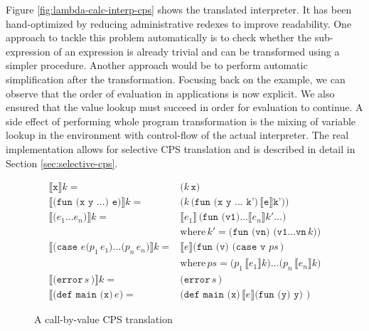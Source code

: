 Figure \ref{fig:lambda-calc-interp-cps} shows the translated interpreter.
It has been hand-optimized by reducing administrative redexes to improve readability.
One approach to tackle this problem automatically is to check whether the sub-expression of an expression is already trivial and can be transformed using a simpler procedure.
Another approach would be to perform automatic simplification after the transformation.
Focusing back on the example, we can observe that the order of evaluation in applications is now explicit.
We also ensured that the value lookup must succeed in order for evaluation to continue.
A side effect of performing whole program transformation is the mixing of variable lookup in the environment with control-flow of the actual interpreter.
The real implementation allows for selective CPS translation and is described in detail in Section \ref{sec:selective-cps}.
\begin{figure}
    \centering
   \begin{align*}
        \llbracket \texttt{x} \rrbracket k =& \texttt{(}k\,\texttt{x)}\\
%
        \llbracket \texttt{(fun (x y ...) e)} \rrbracket k
        =& \texttt{(} k \, \texttt{(fun (x y ... k')}\, \llbracket \texttt{e} \rrbracket \texttt{k'))} \\
%        
        \llbracket \texttt{(}e_1\ldots e_n\texttt{)} \rrbracket k
        =& \llbracket e_1 \rrbracket \, \texttt{(fun (v1)} \ldots \llbracket e_n \rrbracket k' \ldots \texttt{)}\, \\
         & \text{where}\,k' = \texttt{(fun (vn) (v1...vn}\,k\texttt{))} \\
%        
        \llbracket \texttt{(case } e \texttt{(} p_1\,e_1\texttt{)}\ldots \texttt{(} p_n\,e_n\texttt{)} \rrbracket k
        =& \llbracket e \rrbracket \texttt{(fun (v) (case v }ps \,\texttt{)}\\
         & \text{where}\,ps = \texttt{(} p_1\,\llbracket e_1 \rrbracket k  \texttt{)}\ldots \texttt{(} p_n\,\llbracket e_n \rrbracket k \texttt{)}\\
%
        \llbracket \texttt{(error}\,s\,\texttt{)} \rrbracket k
        =& \texttt{(error}\,s\,\texttt{)} \\
%
        \llbracket \texttt{(def main (x)}\,e\texttt{)}
        =& \texttt{(def main (x)}\,\llbracket e \rrbracket \texttt{(fun (y) y)}\,\,\texttt{)}
   \end{align*}
    \caption{A call-by-value CPS translation}
    \label{fig:cps-translation}
\end{figure}

